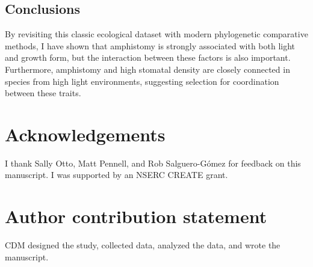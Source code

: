 \documentclass[12pt, oneside]{article}
\begin{document}
\subsection*{Conclusions}

By revisiting this classic ecological dataset with modern phylogenetic comparative methods, I have shown that amphistomy is strongly associated with both light and growth form, but the interaction between these factors is also important. Furthermore, amphistomy and high stomatal density are closely connected in species from high light environments, suggesting selection for coordination between these traits.


\section*{Acknowledgements}
I thank Sally Otto, Matt Pennell, and Rob Salguero-G\'{o}mez for feedback on this manuscript. I was supported by an NSERC CREATE grant.

\section*{Author contribution statement}
CDM designed the study, collected data, analyzed the data, and wrote the manuscript.

\clearpage





\clearpage

\end{document}
